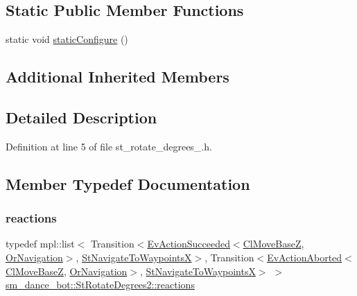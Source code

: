 \subsection*{Static Public Member Functions}
\begin{DoxyCompactItemize}
\item 
static void \hyperlink{structsm__dance__bot_1_1StRotateDegrees2_ac6566aa987d37915d13b974a8fe8df42}{static\+Configure} ()
\end{DoxyCompactItemize}
\subsection*{Additional Inherited Members}


\subsection{Detailed Description}


Definition at line 5 of file st\+\_\+rotate\+\_\+degrees\+\_.\+h.



\subsection{Member Typedef Documentation}
\mbox{\label{structsm__dance__bot_1_1StRotateDegrees2_ac78a9a21e3b11060f12b8403669e3dda}} 
\subsubsection{\texorpdfstring{reactions}{reactions}}
{\footnotesize\ttfamily typedef mpl\+::list$<$ Transition$<$\hyperlink{structsmacc_1_1default__events_1_1EvActionSucceeded}{Ev\+Action\+Succeeded}$<$\hyperlink{classcl__move__base__z_1_1ClMoveBaseZ}{Cl\+Move\+BaseZ}, \hyperlink{classsm__dance__bot_1_1OrNavigation}{Or\+Navigation}$>$, \hyperlink{structsm__dance__bot_1_1StNavigateToWaypointsX}{St\+Navigate\+To\+WaypointsX}$>$, Transition$<$\hyperlink{structsmacc_1_1default__events_1_1EvActionAborted}{Ev\+Action\+Aborted}$<$\hyperlink{classcl__move__base__z_1_1ClMoveBaseZ}{Cl\+Move\+BaseZ}, \hyperlink{classsm__dance__bot_1_1OrNavigation}{Or\+Navigation}$>$, \hyperlink{structsm__dance__bot_1_1StNavigateToWaypointsX}{St\+Navigate\+To\+WaypointsX}$>$ $>$ \hyperlink{structsm__dance__bot_1_1StRotateDegrees2_ac78a9a21e3b11060f12b8403669e3dda}{sm\+\_\+dance\+\_\+bot\+::\+St\+Rotate\+Degrees2\+::reactions}}



